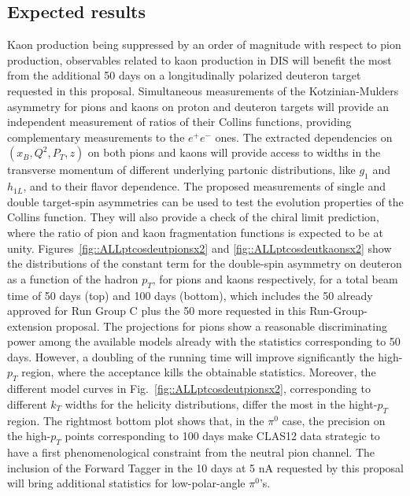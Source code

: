 \subsection{Expected results}
%
Kaon production being suppressed by an order of magnitude with respect to pion production, observables related to kaon production in DIS will benefit the most from the additional 50 days on a longitudinally polarized deuteron target requested in this proposal. Simultaneous measurements of the Kotzinian-Mulders asymmetry for pions and kaons on proton and deuteron targets will provide an independent measurement of ratios of their Collins functions, providing complementary measurements to the $e^+e^-$ ones. 
The extracted dependencies on $(x_B, Q^2, P_T, z)$ on both pions and kaons will provide access to widths in the transverse momentum of different underlying partonic distributions, like $g_1$ and $h_{1L}$, and to their flavor dependence. The proposed measurements of single and double target-spin asymmetries can be used to test the evolution properties of the Collins function. They will also provide a check of the chiral limit prediction, where the ratio of pion and kaon fragmentation functions is expected to be at unity. 
Figures~\ref{fig::ALLptcosdeutpionsx2} and \ref{fig::ALLptcosdeutkaonsx2} show the distributions of the constant term for the double-spin asymmetry on deuteron as a function of the hadron $p_T$, for pions and kaons respectively, for a total beam time of 50 days (top) and 100 days (bottom), which includes the 50 already approved for Run Group C plus the 50 more requested in this Run-Group-extension proposal. 
The projections for pions show a reasonable discriminating power among the available models already with the statistics corresponding to 50 days. However, a doubling of the running time will improve significantly the high-$p_T$ region, where the acceptance kills the obtainable statistics. Moreover, the different model curves in Fig.~\ref{fig::ALLptcosdeutpionsx2}, corresponding to different $k_T$ widths for the helicity distributions, differ the most in the hight-$p_T$ region. The rightmost bottom plot shows that, in the $\pi^0$ case, the precision on the high-$p_T$ points corresponding to 100 days make CLAS12 data strategic to have a first phenomenological constraint from the neutral pion channel. The inclusion of the Forward Tagger in the 10 days at 5 nA requested by this proposal will bring additional statistics for low-polar-angle $\pi^0$'s. 
